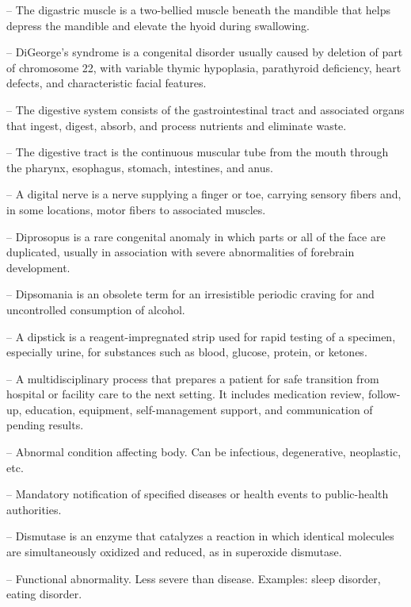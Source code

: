 -- The digastric muscle is a two-bellied muscle beneath the mandible that helps depress the mandible and elevate the hyoid during swallowing.

-- DiGeorge's syndrome is a congenital disorder usually caused by deletion of part of chromosome 22, with variable thymic hypoplasia, parathyroid deficiency, heart defects, and characteristic facial features.

-- The digestive system consists of the gastrointestinal tract and associated organs that ingest, digest, absorb, and process nutrients and eliminate waste.

-- The digestive tract is the continuous muscular tube from the mouth through the pharynx, esophagus, stomach, intestines, and anus.

-- A digital nerve is a nerve supplying a finger or toe, carrying sensory fibers and, in some locations, motor fibers to associated muscles.

-- Diprosopus is a rare congenital anomaly in which parts or all of the face are duplicated, usually in association with severe abnormalities of forebrain development.

-- Dipsomania is an obsolete term for an irresistible periodic craving for and uncontrolled consumption of alcohol.

-- A dipstick is a reagent-impregnated strip used for rapid testing of a specimen, especially urine, for substances such as blood, glucose, protein, or ketones.

-- A multidisciplinary process that prepares a patient for safe transition from hospital or facility care to the next setting. It includes medication review, follow-up, education, equipment, self-management support, and communication of pending results.

-- Abnormal condition affecting body. Can be infectious, degenerative, neoplastic, etc.

-- Mandatory notification of specified diseases or health events to public-health authorities.

-- Dismutase is an enzyme that catalyzes a reaction in which identical molecules are simultaneously oxidized and reduced, as in superoxide dismutase.

-- Functional abnormality. Less severe than disease. Examples: sleep disorder, eating disorder.

